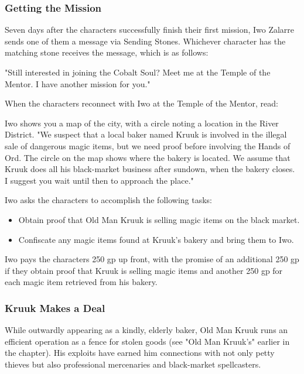 \documentclass[10pt,a4paper,twoside,twocolumn,openany,nodeprecatedcode]{dndbook}
\begin{document}
\subsubsection{Getting the Mission}
Seven days after the characters successfully finish their first mission, Iwo Zalarre sends one of them a message via Sending Stones. Whichever character has the matching stone receives the message, which is as follows:

\begin{DndReadAloud}{}
"Still interested in joining the Cobalt Soul? Meet me at the Temple of the Mentor. I have another mission for you."

\end{DndReadAloud}

When the characters reconnect with Iwo at the Temple of the Mentor, read:

\begin{DndReadAloud}{}
Iwo shows you a map of the city, with a circle noting a location in the River District. "We suspect that a local baker named Kruuk is involved in the illegal sale of dangerous magic items, but we need proof before involving the Hands of Ord. The circle on the map shows where the bakery is located. We assume that Kruuk does all his black-market business after sundown, when the bakery closes. I suggest you wait until then to approach the place."

\end{DndReadAloud}

Iwo asks the characters to accomplish the following tasks:


\begin{itemize}
\item Obtain proof that Old Man Kruuk is selling magic items on the black market.
\item Confiscate any magic items found at Kruuk's bakery and bring them to Iwo.
\end{itemize}

Iwo pays the characters 250 gp up front, with the promise of an additional 250 gp if they obtain proof that Kruuk is selling magic items and another 250 gp for each magic item retrieved from his bakery.

\subsubsection{Kruuk Makes a Deal}
While outwardly appearing as a kindly, elderly baker, Old Man Kruuk runs an efficient operation as a fence for stolen goods (see "Old Man Kruuk's" earlier in the chapter). His exploits have earned him connections with not only petty thieves but also professional mercenaries and black-market spellcasters.
\end{document}
